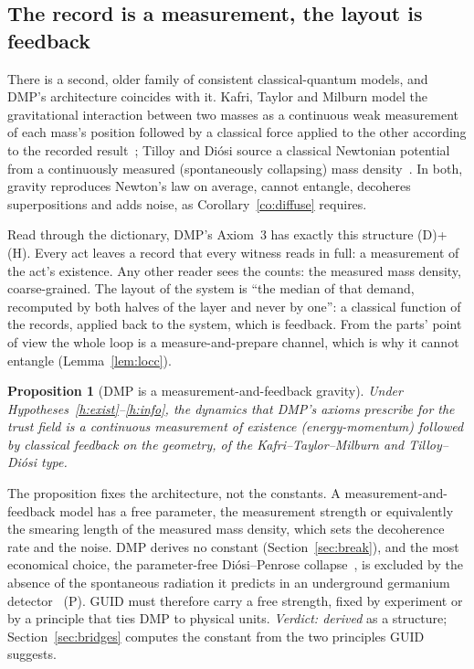 \documentclass[11pt,a4paper]{article}
\newtheorem{proposition}{Proposition}
\theoremstyle{definition}
\theoremstyle{remark}
\newcommand{\tagD}{\textsf{(D)}}
\newcommand{\tagH}{\textsf{(H)}}
\newcommand{\tagP}{\textsf{(P)}}
\theoremstyle{definition}
\begin{document}
\subsection{The record is a measurement, the layout is feedback}

There is a second, older family of consistent classical-quantum models, and DMP's architecture coincides with it. Kafri, Taylor and Milburn
model the gravitational interaction between two masses as a continuous weak measurement of each mass's position followed by a classical
force applied to the other according to the recorded result~\cite{ktm}; Tilloy and Di\'osi source a classical Newtonian potential from a
continuously measured (spontaneously collapsing) mass density~\cite{tilloydiosi}. In both, gravity reproduces Newton's law on average,
cannot entangle, decoheres superpositions and adds noise, as Corollary~\ref{co:diffuse} requires.

Read through the dictionary, DMP's Axiom~3 has exactly this structure \tagD+\tagH. Every act leaves a record that every witness reads in
full: a measurement of the act's existence. Any other reader sees the counts: the measured mass density, coarse-grained. The layout of the
system is ``the median of that demand, recomputed by both halves of the layer and never by one'': a classical function of the records,
applied back to the system, which is feedback. From the parts' point of view the whole loop is a measure-and-prepare channel, which is why
it cannot entangle (Lemma~\ref{lem:locc}).

\begin{proposition}[DMP is a measurement-and-feedback gravity]\label{pr:ktm}
Under Hypotheses~\ref{h:exist}--\ref{h:info}, the dynamics that DMP's axioms prescribe for the trust field is a continuous measurement of
existence (energy-momentum) followed by classical feedback on the geometry, of the Kafri--Taylor--Milburn and Tilloy--Di\'osi type.
\end{proposition}

The proposition fixes the architecture, not the constants. A measurement-and-feedback model has a free parameter, the measurement strength
or equivalently the smearing length of the measured mass density, which sets the decoherence rate and the noise. DMP derives no constant
(Section~\ref{sec:break}), and the most economical choice, the parameter-free Di\'osi--Penrose collapse~\cite{diosi87,penrose96}, is
excluded by the absence of the spontaneous radiation it predicts in an underground germanium detector~\cite{donadi} \tagP. GUID must
therefore carry a free strength, fixed by experiment or by a principle that ties DMP to physical units. \emph{Verdict: derived} as a
structure; Section~\ref{sec:bridges} computes the constant from the two principles GUID suggests.
\end{document}
